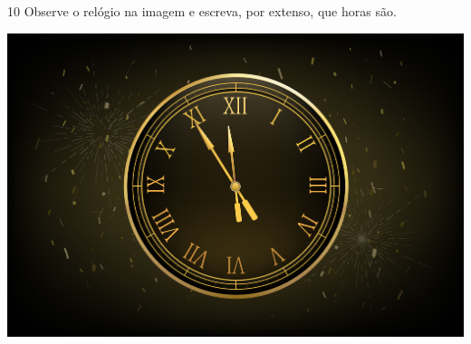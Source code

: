 \num{10} Observe o relógio na imagem e escreva, por extenso, que horas são.

\begin{center}
\includegraphics[width=.8\textwidth]{media/image7a.jpeg}
\end{center}

